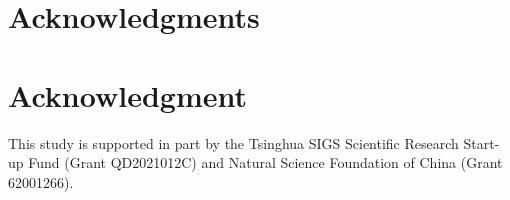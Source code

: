 \documentclass[journal]{IEEEtran}
\begin{document}
\ifCLASSOPTIONcompsoc
  \section*{Acknowledgments}
\else
  \section*{Acknowledgment}
  This study is supported in part by the Tsinghua SIGS Scientific Research Start-up Fund (Grant QD2021012C) and Natural Science Foundation of China (Grant 62001266).
\fi






\ifCLASSOPTIONcaptionsoff
  \newpage
\fi





%



% 
\end{document}

